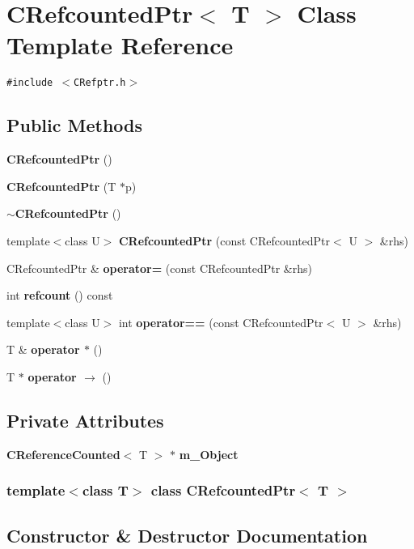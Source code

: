 \section{CRefcounted\-Ptr$<$ T $>$  Class Template Reference}
\label{classCRefcountedPtr}
{\tt \#include $<$CRefptr.h$>$}

\subsection*{Public Methods}
\begin{CompactItemize}
\item 
{\bf CRefcounted\-Ptr} ()
\item 
{\bf CRefcounted\-Ptr} (T $\ast$p)
\item 
{\bf $\sim$CRefcounted\-Ptr} ()
\item 
template$<$class U$>$ {\bf CRefcounted\-Ptr} (const CRefcounted\-Ptr$<$ U $>$ \&rhs)
\item 
CRefcounted\-Ptr \& {\bf operator=} (const CRefcounted\-Ptr \&rhs)
\item 
int {\bf refcount} () const
\item 
template$<$class U$>$ int {\bf operator==} (const CRefcounted\-Ptr$<$ U $>$ \&rhs)
\item 
T \& {\bf operator $\ast$} ()
\item 
T $\ast$ {\bf operator $\rightarrow$ } ()
\end{CompactItemize}
\subsection*{Private Attributes}
\begin{CompactItemize}
\item 
{\bf CReference\-Counted}$<$ T $>$ $\ast$ {\bf m\_\-Object}
\end{CompactItemize}
\subsubsection*{template$<$class T$>$ class CRefcounted\-Ptr$<$ T $>$}



\subsection{Constructor \& Destructor Documentation}
